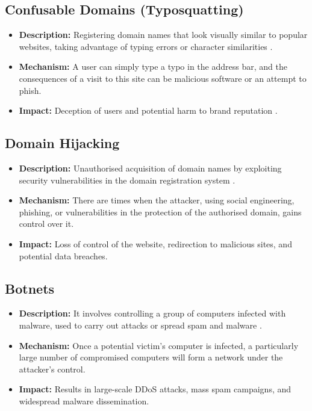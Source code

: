 \subsection{Confusable Domains (Typosquatting)}
\begin{itemize}
    \item \textbf{Description:} Registering domain names that look visually similar to popular websites, taking advantage of typing errors or character similarities \cite{inta2023dnstypo}.
    \item \textbf{Mechanism:} A user can simply type a typo in the address bar, and the consequences of a visit to this site can be malicious software or an attempt to phish.
    \item \textbf{Impact:} Deception of users and potential harm to brand reputation \cite{edelman2008typosquatting}.
\end{itemize}

\subsection{Domain Hijacking}
\begin{itemize}
    \item \textbf{Description:} Unauthorised acquisition of domain names by exploiting security vulnerabilities in the domain registration system \cite{inta2023dnstypo}.
    \item \textbf{Mechanism:} There are times when the attacker, using social engineering, phishing, or vulnerabilities in the protection of the authorised domain, gains control over it.
    \item \textbf{Impact:} Loss of control of the website, redirection to malicious sites, and potential data breaches.
\end{itemize}

\subsection{Botnets}
\begin{itemize}
    \item \textbf{Description:} It involves controlling a group of computers infected with malware, used to carry out attacks or spread spam and malware \cite{citpyour}.
    \item \textbf{Mechanism:} Once a potential victim’s computer is infected, a particularly large number of compromised computers will form a network under the attacker’s control.
    \item \textbf{Impact:} Results in large-scale DDoS attacks, mass spam campaigns, and widespread malware dissemination.
\end{itemize}

